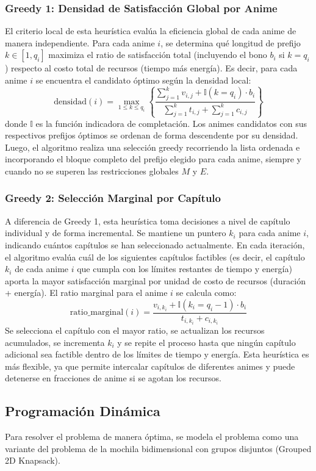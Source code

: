 \documentclass[11pt,spanish]{article} %
\begin{document}
\subsubsection{Greedy 1: Densidad de Satisfacción Global por Anime}
El criterio local de esta heurística evalúa la eficiencia global de cada anime de manera independiente. Para cada anime $i$, se determina qué longitud de prefijo $k \in [1, q_i]$ maximiza el ratio de satisfacción total (incluyendo el bono $b_i$ si $k = q_i$) respecto al costo total de recursos (tiempo más energía). Es decir, para cada anime $i$ se encuentra el candidato óptimo según la densidad local:
\[
\text{densidad}(i) = \max_{1 \le k \le q_i} \left\{ \frac{\sum_{j=1}^k v_{i,j} + \mathbb{I}(k = q_i) \cdot b_i}{\sum_{j=1}^k t_{i,j} + \sum_{j=1}^k c_{i,j}} \right\}
\]
donde $\mathbb{I}$ es la función indicadora de completación. Los animes candidatos con sus respectivos prefijos óptimos se ordenan de forma descendente por su densidad. Luego, el algoritmo realiza una selección greedy recorriendo la lista ordenada e incorporando el bloque completo del prefijo elegido para cada anime, siempre y cuando no se superen las restricciones globales $M$ y $E$.

\subsubsection{Greedy 2: Selección Marginal por Capítulo}
A diferencia de Greedy 1, esta heurística toma decisiones a nivel de capítulo individual y de forma incremental. Se mantiene un puntero $k_i$ para cada anime $i$, indicando cuántos capítulos se han seleccionado actualmente. En cada iteración, el algoritmo evalúa cuál de los siguientes capítulos factibles (es decir, el capítulo $k_i$ de cada anime $i$ que cumpla con los límites restantes de tiempo y energía) aporta la mayor satisfacción marginal por unidad de costo de recursos (duración + energía). El ratio marginal para el anime $i$ se calcula como:
\[
\text{ratio\_marginal}(i) = \frac{v_{i, k_i} + \mathbb{I}(k_i = q_i - 1) \cdot b_i}{t_{i, k_i} + c_{i, k_i}}
\]
Se selecciona el capítulo con el mayor ratio, se actualizan los recursos acumulados, se incrementa $k_i$ y se repite el proceso hasta que ningún capítulo adicional sea factible dentro de los límites de tiempo y energía. Esta heurística es más flexible, ya que permite intercalar capítulos de diferentes animes y puede detenerse en fracciones de anime si se agotan los recursos.

\subsection{Programación Dinámica}
Para resolver el problema de manera óptima, se modela el problema como una variante del problema de la mochila bidimensional con grupos disjuntos (Grouped 2D Knapsack).
\end{document}
